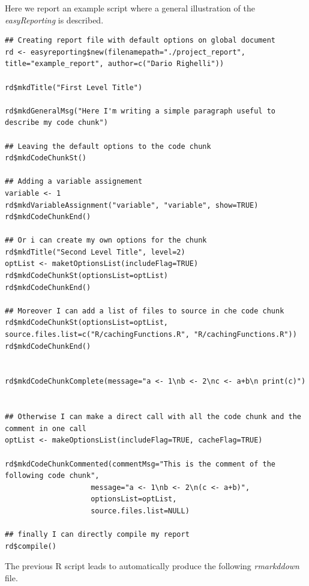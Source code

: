 Here we report an example script where a general illustration of the \textit{easyReporting} is described.

\begin{lstlisting}
## Creating report file with default options on global document
rd <- easyreporting$new(filenamepath="./project_report", title="example_report", author=c("Dario Righelli"))

rd$mkdTitle("First Level Title")

rd$mkdGeneralMsg("Here I'm writing a simple paragraph useful to describe my code chunk")

## Leaving the default options to the code chunk
rd$mkdCodeChunkSt()

## Adding a variable assignement
variable <- 1
rd$mkdVariableAssignment("variable", "variable", show=TRUE)
rd$mkdCodeChunkEnd()

## Or i can create my own options for the chunk
rd$mkdTitle("Second Level Title", level=2)
optList <- maketOptionsList(includeFlag=TRUE)
rd$mkdCodeChunkSt(optionsList=optList)
rd$mkdCodeChunkEnd()

## Moreover I can add a list of files to source in che code chunk
rd$mkdCodeChunkSt(optionsList=optList, source.files.list=c("R/cachingFunctions.R", "R/cachingFunctions.R"))
rd$mkdCodeChunkEnd()


rd$mkdCodeChunkComplete(message="a <- 1\nb <- 2\nc <- a+b\n print(c)")


## Otherwise I can make a direct call with all the code chunk and the comment in one call
optList <- makeOptionsList(includeFlag=TRUE, cacheFlag=TRUE)

rd$mkdCodeChunkCommented(commentMsg="This is the comment of the following code chunk",
                    message="a <- 1\nb <- 2\n(c <- a+b)",
                    optionsList=optList,
                    source.files.list=NULL)

## finally I can directly compile my report
rd$compile()
\end{lstlisting}
 
The previous R script leads to automatically produce the following \textit{rmarkddown} file.

